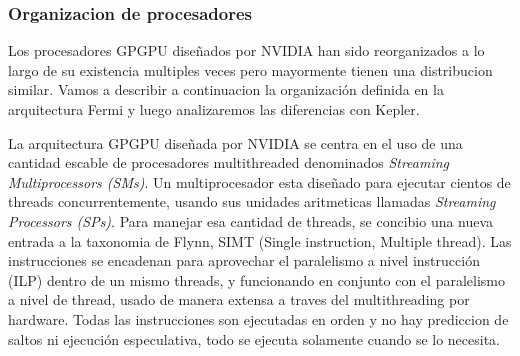 \subsubsection{Organizacion de procesadores}

Los procesadores GPGPU dise\~nados por NVIDIA han sido reorganizados a lo largo de su
existencia multiples veces pero mayormente tienen una distribucion similar. Vamos a describir a continuacion
la organizaci\'on definida en la arquitectura Fermi y luego analizaremos las diferencias con Kepler.

La arquitectura GPGPU dise\~nada por NVIDIA se centra en el uso de una cantidad escable de procesadores
multithreaded denominados \textit{Streaming Multiprocessors (SMs)}. Un multiprocesador esta dise\~nado
para ejecutar cientos de threads concurrentemente, usando sus unidades aritmeticas llamadas \textit{Streaming
Processors (SPs)}. Para manejar esa cantidad de threads, se concibio una nueva entrada a la taxonomia de Flynn,
SIMT (Single instruction, Multiple thread). Las instrucciones se encadenan para aprovechar el paralelismo
a nivel instrucci\'on (ILP) dentro de un mismo threads, y funcionando en conjunto con el paralelismo
a nivel de thread, usado de manera extensa a traves del multithreading por hardware. Todas las instrucciones
son ejecutadas en orden y no hay prediccion de saltos ni ejecuci\'on especulativa, todo se ejecuta solamente
cuando se lo necesita. ~\cite{CudaOverview}


